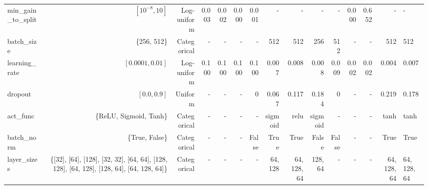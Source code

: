 \begin{tabular}{lrrrrrrrrrrrrr}
min_gain_to_split & $[10^{-8}, 10]$ & Log-uniform & 0.003 & 0.002 & 0.000 & 0.001 & - & - & - & - & 0.000 & 0.652 & - & - \\
batch_size & \{256, 512\} & Categorical & - & - & - & - & 512 & 512 & 256 & 512 & - & - & 512 & 512 \\
learning_rate & $[0.0001, 0.01]$ & Log-uniform & 0.100 & 0.100 & 0.100 & 0.100 & 0.007 & 0.008 & 0.008 & 0.009 & 0.002 & 0.002 & 0.004 & 0.007 \\
dropout & $[0.0, 0.9]$ & Uniform & - & - & - & 0 & 0.067 & 0.117 & 0.184 & 0 & - & - & 0.219 & 0.178 \\
act_func & \{ReLU, Sigmoid, Tanh\} & Categorical & - & - & - & - & sigmoid & relu & sigmoid & - & - & - & tanh & tanh \\
batch_norm & \{True, False\} & Categorical & - & - & - & False & True & True & False & False & - & - & True & True \\
layer_sizes & \{[32], [64], [128], [32, 32], [64, 64], [128, 128], [64, 128], [128, 64], [64, 128, 64]\} & Categorical & - & - & - & - & 64, 128 & 64, 128, 64 & 128, 64 & - & - & - & 64, 128, 64 & 64, 128, 64 \\
\bottomrule
\end{tabular}
